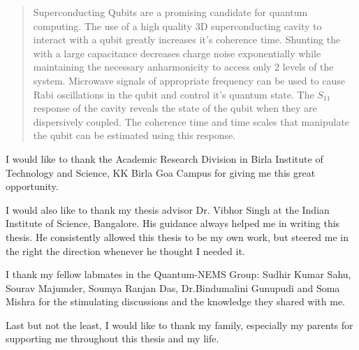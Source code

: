 \documentclass[
11pt, %
oneside, %
english, %
doublespacing, %
headsepline, %
]{MastersDoctoralThesis} %
\begin{document}
\begin{abstract}
\addchaptertocentry{\abstractname} %
Superconducting Qubits are a promising candidate for quantum computing. The use of a high quality 3D superconducting cavity to interact with a \JJ qubit greatly increases it's coherence time. Shunting the \JJ with a large capacitance decreases charge noise exponentially while maintaining the necessary anharmonicity to access only 2 levels of the system. Microwave signals of appropriate frequency can be used to cause Rabi oscillations in the qubit and control it's quantum state. The $S_{11}$ response of the cavity reveals the state of the qubit when they are dispersively coupled. The coherence time and time scales that manipulate the qubit can be estimated using this response.
\end{abstract}


\begin{acknowledgements}
\addchaptertocentry{\acknowledgementname} %
I would like to thank the Academic Research Division in Birla Institute of Technology and Science, KK Birla Goa Campus for giving me this great opportunity.
 
I would also like to thank my thesis advisor Dr. Vibhor Singh at the Indian Institute of Science, Bangalore. His guidance always helped me in writing this thesis. He consistently allowed this thesis to be my own work, but steered me in the right the direction whenever he thought I needed it.

I thank my fellow labmates in the Quantum-NEMS Group: Sudhir Kumar Sahu, Sourav Majumder, Soumya Ranjan Das, Dr.Bindumalini Gunupudi and Soma Mishra for the stimulating discussions and the knowledge they shared with me.

Last but not the least, I would like to thank my family, especially my parents for supporting me throughout this thesis and my life.
\end{acknowledgements}

\end{document}
